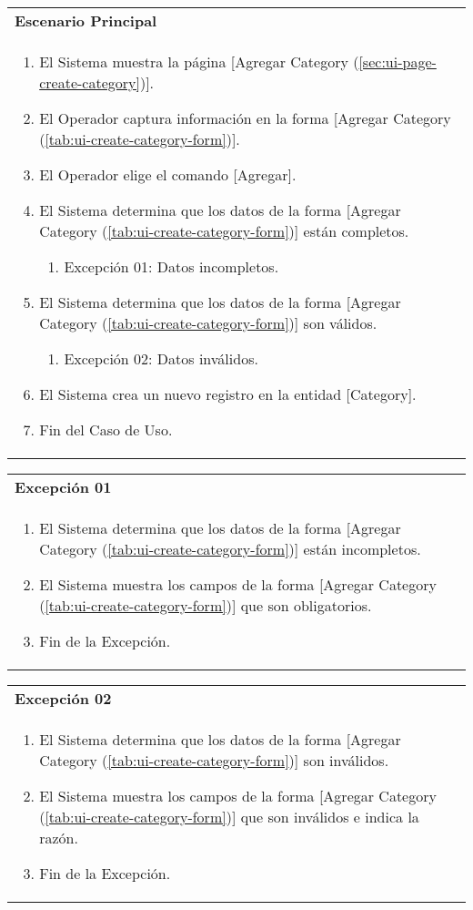 	\begin{tabular}{ p{15.5cm} }
		\textbf{Escenario Principal} \\
		\begin{enumerate}
			\item El Sistema muestra la p\'agina [Agregar Category (\ref{sec:ui-page-create-category})].
			\item El Operador captura informaci\'on en la forma [Agregar Category (\ref{tab:ui-create-category-form})].
			\item El Operador elige el comando [Agregar].
			\item El Sistema determina que los datos de la forma [Agregar Category (\ref{tab:ui-create-category-form})] est\'an completos.
				\begin{enumerate}
					\item Excepci\'on 01: Datos incompletos.
				\end{enumerate}
			\item El Sistema determina que los datos de la forma [Agregar Category (\ref{tab:ui-create-category-form})] son v\'alidos.
				\begin{enumerate}
					\item Excepci\'on 02: Datos inv\'alidos.
				\end{enumerate}
			\item El Sistema crea un nuevo registro en la entidad [Category].
			\item Fin del Caso de Uso.
		\end{enumerate}
	\end{tabular}
	
	\begin{tabular}{ p{15.5cm} }
		\textbf{Excepci\'on 01} \\
		\begin{enumerate}
			\item El Sistema determina que los datos de la forma [Agregar Category (\ref{tab:ui-create-category-form})] est\'an incompletos.
			\item El Sistema muestra los campos de la forma [Agregar Category (\ref{tab:ui-create-category-form})] que son obligatorios.
			\item Fin de la Excepci\'on.
		\end{enumerate}
	\end{tabular}
	
	\begin{tabular}{ p{15.5cm} }
		\textbf{Excepci\'on 02} \\
		\begin{enumerate}
			\item El Sistema determina que los datos de la forma [Agregar Category (\ref{tab:ui-create-category-form})] son inv\'alidos.
			\item El Sistema muestra los campos de la forma [Agregar Category (\ref{tab:ui-create-category-form})] que son inv\'alidos e indica la raz\'on.
			\item Fin de la Excepci\'on.
		\end{enumerate}
	\end{tabular}
	
